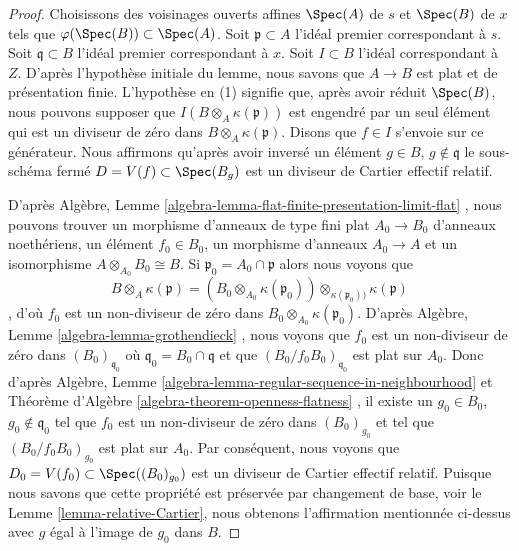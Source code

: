 \begin{proof}
Choisissons des voisinages ouverts affines  $\Spec(A)$  de  $s$  et
 $\Spec(B)$  de  $x$  tels que  $\varphi(\Spec(B)) \subset \Spec(A)$. Soit  $\mathfrak p \subset A$  l'idéal
premier correspondant à  $s$. Soit  $\mathfrak q \subset B$  l'idéal premier
correspondant à  $x$. Soit  $I \subset B$  l'idéal correspondant à
 $Z$. D'après l'hypothèse initiale du lemme, nous savons que  $A \to B$ 
est plat et de présentation finie. L'hypothèse en (1) signifie que, après avoir
réduit  $\Spec(B)$, nous pouvons supposer que  $I(B \otimes_A \kappa(\mathfrak p))$  est engendré par un
seul élément qui est un diviseur de zéro dans  $B \otimes_A \kappa(\mathfrak p)$. Disons que
 $f \in I$  s'envoie sur ce générateur. Nous affirmons qu'après avoir inversé un
élément  $g \in B$,  $g \not \in \mathfrak q$  le sous-schéma fermé  $D = V(f) \subset \Spec(B_g)$  est un
diviseur de Cartier effectif relatif.

\medskip\noindent
D'après Algèbre, Lemme  \ref{algebra-lemma-flat-finite-presentation-limit-flat} , nous pouvons trouver un morphisme d'anneaux
de type fini plat  $A_0 \to B_0$  d'anneaux noethériens, un élément  $f_0 \in B_0$, un
morphisme d'anneaux  $A_0 \to A$  et un isomorphisme  $A \otimes_{A_0} B_0 \cong B$. Si  $\mathfrak p_0 = A_0 \cap \mathfrak p$ 
alors nous voyons que
$$
B \otimes_A \kappa(\mathfrak p) =
\left(B_0 \otimes_{A_0} \kappa(\mathfrak p_0)\right)
\otimes_{\kappa(\mathfrak p_0))} \kappa(\mathfrak p)
$$
, d'où  $f_0$  est un non-diviseur de zéro dans  $B_0 \otimes_{A_0} \kappa(\mathfrak p_0)$. D'après
Algèbre, Lemme  \ref{algebra-lemma-grothendieck} , nous voyons que  $f_0$  est un non-diviseur de
zéro dans  $(B_0)_{\mathfrak q_0}$  où  $\mathfrak q_0 = B_0 \cap \mathfrak q$  et que  $(B_0/f_0B_0)_{\mathfrak q_0}$  est plat sur
 $A_0$. Donc d'après Algèbre, Lemme  \ref{algebra-lemma-regular-sequence-in-neighbourhood}  et Théorème d'Algèbre
 \ref{algebra-theorem-openness-flatness} , il existe un  $g_0 \in B_0$,  $g_0 \not \in \mathfrak q_0$  tel que  $f_0$  est un
non-diviseur de zéro dans  $(B_0)_{g_0}$  et tel que  $(B_0/f_0B_0)_{g_0}$  est plat sur
 $A_0$. Par conséquent, nous voyons que  $D_0 = V(f_0) \subset \Spec((B_0)_{g_0})$  est un diviseur de
Cartier effectif relatif. Puisque nous savons que cette propriété est préservée
par changement de base, voir le Lemme  \ref{lemma-relative-Cartier}, nous obtenons l'affirmation
mentionnée ci-dessus avec  $g$  égal à l'image de  $g_0$  dans
 $B$.


\end{proof}
